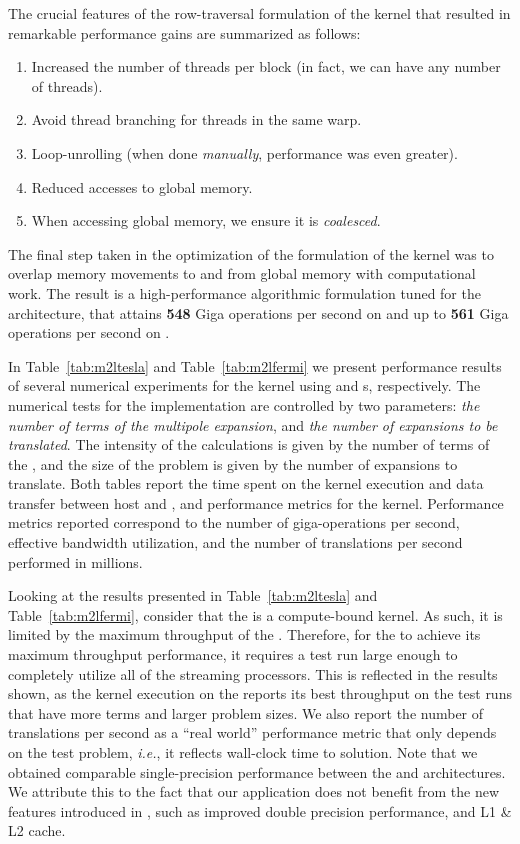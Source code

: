 \medskip

The crucial features of the row-traversal formulation of the kernel that resulted in remarkable performance gains are summarized as follows:

\begin{enumerate}
\item Increased the number of threads per block (in fact, we can have any number of threads).
\item Avoid thread branching for threads in the same warp.
\item Loop-unrolling (when done \emph{manually}, performance was even greater).
\item Reduced accesses to global memory.
\item When accessing global memory, we ensure it is \emph{coalesced}.
\end{enumerate}

The final step taken in the optimization of the {\gpu} formulation of the kernel was to overlap memory movements to and from global memory with computational work. The result is a high-performance algorithmic formulation tuned for the {\gpu} architecture, that attains \textbf{548} Giga operations per second on {\tesla} and up to \textbf{561} Giga operations per second on {\fermi}.

In  Table~\ref{tab:m2ltesla} and Table~\ref{tab:m2lfermi} we present performance results of several numerical experiments for the {\ML} kernel using {\tesla} and {\fermi} {\gpu}s, respectively. The numerical tests for the {\ML} implementation are controlled by two parameters: \emph{the number of terms of the multipole expansion}, and \emph{the number of expansions to be translated}. The intensity of the calculations is given by the number of terms of the {\ME}, and the size of the problem is given by the number of expansions to translate. Both tables report the time spent on the kernel execution and data transfer between host and {\gpu}, and performance metrics for the {\ML} kernel. Performance metrics reported correspond to the number of giga-operations per second, effective bandwidth utilization, and the number of {\ML} translations per second performed in millions.

Looking at the results presented in Table~\ref{tab:m2ltesla} and Table~\ref{tab:m2lfermi}, consider that the {\ML} is a compute-bound kernel. As such, it is limited by the maximum throughput of the {\gpu}. Therefore, for the {\gpu} to achieve its maximum throughput performance, it requires a test run large enough to completely utilize all of the streaming processors. This is reflected in the results shown, as the {\ML} kernel execution on the {\gpu} reports its best throughput on the test runs that have more {\ME} terms and larger problem sizes. We also report the number of translations per second as a ``real world'' performance metric that only depends on the test problem, \emph{i.e.}, it reflects wall-clock time to solution. Note that we obtained comparable single-precision performance between the {\tesla} and {\fermi} architectures. We attribute this to the fact that our application does not benefit from the new features introduced in {\fermi}, such as improved double precision performance, and L1 \& L2 cache. 

